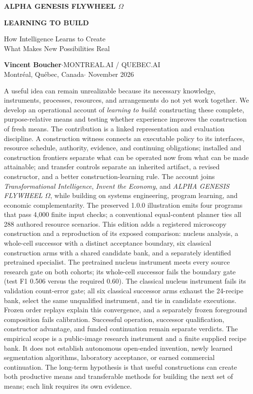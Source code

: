\documentclass[11pt,letterpaper]{article}
\theoremstyle{remark}\newtheorem{remark}{Remark}[section]
\newcommand{\smallhead}[1]{\par\smallskip{\sffamily\bfseries\color{Gold}#1}\par\smallskip}
\begin{document}

\setcounter{page}{1}
\begin{center}
{\small\sffamily\bfseries\color{Gold}ALPHA GENESIS FLYWHEEL $\Omega$}\par\vspace{.12in}
{\LARGE\bfseries\color{Plum}LEARNING TO BUILD}\par\vspace{.1in}
{\Large How Intelligence Learns to Create\\What Makes New Possibilities Real}\par\vspace{.16in}
\textbf{Vincent Boucher}\quad$\cdot$\quad MONTREAL.AI / QUEBEC.AI\\
{\small Montr\'{e}al, Qu\'{e}bec, Canada\quad$\cdot$ November 2026}
\end{center}
\smallhead{ABSTRACT}
A useful idea can remain unrealizable because its necessary knowledge, instruments, processes, resources, and arrangements do not yet work together. We develop an operational account of \emph{learning to build}: constructing these complete, purpose-relative means and testing whether experience improves the construction of fresh means. The contribution is a linked representation and evaluation discipline. A construction witness connects an executable policy to its interfaces, resource schedule, authority, evidence, and continuing obligations; installed and construction frontiers separate what can be operated now from what can be made attainable; and transfer controls separate an inherited artifact, a revised constructor, and a better construction-learning rule. The account joins \emph{Transformational Intelligence}, \emph{Invent the Economy}, and \emph{ALPHA GENESIS FLYWHEEL $\Omega$}, while building on systems engineering, program learning, and economic complementarity. The preserved 1.0.0 illustration emits four programs that pass 4,000 finite input checks; a conventional equal-content planner ties all 288 authored resource scenarios. This edition adds a registered microscopy construction and a reproduction of its exposed comparison: nucleus analysis, a whole-cell successor with a distinct acceptance boundary, six classical construction arms with a shared candidate bank, and a separately identified pretrained specialist. The pretrained nucleus instrument meets every source research gate on both cohorts; its whole-cell successor fails the boundary gate (test F1 0.506 versus the required 0.60). The classical nucleus instrument fails its validation count-error gate; all six classical successor arms exhaust the 24-recipe bank, select the same unqualified instrument, and tie in candidate executions. Frozen order replays explain this convergence, and a separately frozen foreground composition fails calibration. Successful operation, successor qualification, constructor advantage, and funded continuation remain separate verdicts. The empirical scope is a public-image research instrument and a finite supplied recipe bank. It does not establish autonomous open-ended invention, newly learned segmentation algorithms, laboratory acceptance, or earned commercial continuation. The long-term hypothesis is that useful constructions can create both productive means and transferable methods for building the next set of means; each link requires its own evidence.
\end{document}
